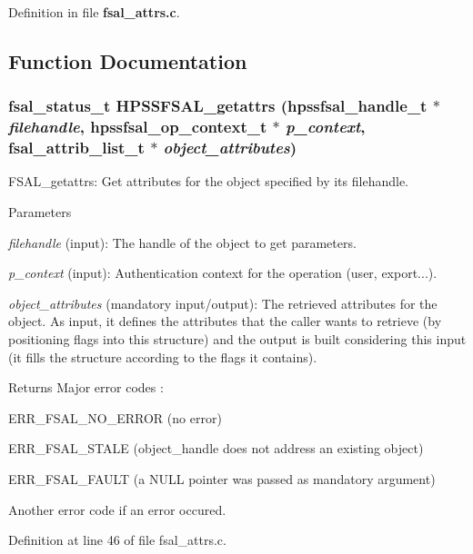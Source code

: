Definition in file {\bf fsal\_\-attrs.c}.

\subsection{Function Documentation}
\subsubsection[{HPSSFSAL\_\-getattrs}]{\setlength{\rightskip}{0pt plus 5cm}fsal\_\-status\_\-t HPSSFSAL\_\-getattrs (hpssfsal\_\-handle\_\-t $\ast$ {\em filehandle}, \/  hpssfsal\_\-op\_\-context\_\-t $\ast$ {\em p\_\-context}, \/  fsal\_\-attrib\_\-list\_\-t $\ast$ {\em object\_\-attributes})}\label{fsal__attrs_8c_a37b1f868704b51a6e08bfd27b32699cb}
FSAL\_\-getattrs: Get attributes for the object specified by its filehandle.


\begin{DoxyParams}{Parameters}
\item[{\em filehandle}](input): The handle of the object to get parameters. \item[{\em p\_\-context}](input): Authentication context for the operation (user, export...). \item[{\em object\_\-attributes}](mandatory input/output): The retrieved attributes for the object. As input, it defines the attributes that the caller wants to retrieve (by positioning flags into this structure) and the output is built considering this input (it fills the structure according to the flags it contains).\end{DoxyParams}
\begin{DoxyReturn}{Returns}
Major error codes :
\begin{DoxyItemize}
\item ERR\_\-FSAL\_\-NO\_\-ERROR (no error)
\item ERR\_\-FSAL\_\-STALE (object\_\-handle does not address an existing object)
\item ERR\_\-FSAL\_\-FAULT (a NULL pointer was passed as mandatory argument)
\item Another error code if an error occured. 
\end{DoxyItemize}
\end{DoxyReturn}


Definition at line 46 of file fsal\_\-attrs.c.

